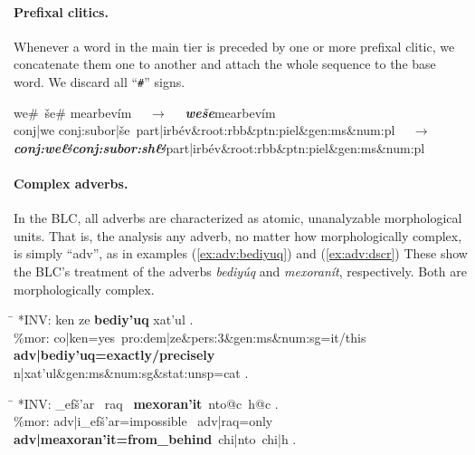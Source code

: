 \paragraph{Prefixal clitics.}
Whenever a word in the main tier is preceded by one or more prefixal clitic, we concatenate them one to another and attach the whole sequence to the base word. We discard all ``\texttt{\#}'' signs.
\begin{exe}\label{ex:preclitics}
	\ex
	\textsf{we\#\, \v{s}e\# mearbev\'im} $\quad\to\quad$ \textbf{\textit{\textsf{we\v{s}e}}}\textsf{mearbev\'im}\\
	\textsf{conj|we conj:subor|\v{s}e\, part|irb\'ev\&root:rbb\&ptn:piel\&gen:ms\&num:pl} $\quad\to\quad$  \\
	\textit{\textbf{\textsf{conj:we\&conj:subor:sh\&}}}\textsf{part|irb\'ev\&root:rbb\&ptn:piel\&gen:ms\&num:pl}
\end{exe}

\paragraph{Complex adverbs.} In the \ac{BLC}, all adverbs are characterized as atomic, unanalyzable morphological units. That is,
the analysis any adverb, no matter how morphologically complex, is simply ``adv'', as in 
examples (\ref{ex:adv:bediyuq}) and (\ref{ex:adv:dscr})  These show the \ac{BLC}'s treatment of the adverbs \textit{\textsf{bediy\'{u}q}} and \textit{\textsf{mexoran\'{i}t}}, respectively. Both are 
morphologically complex.

\begin{exe}
\ex \label{ex:adv:bediyuq}
	\begin{tabbing}
	\hspace{0.6in} \= \hspace{5.5in} \kill
	\textsf{*INV:} \> \textsf{ken ze \textbf{bediy\a'{u}q} xat\a'{u}l .} \\
	\textsf{\%mor:} \> \textsf{co|ken=yes\, pro:dem|ze\&pers:3\&gen:ms\&num:sg=it/this} \\
				\> \textsf{\textbf{adv|bediy\a'{u}q=exactly/precisely}} \\
				\> \textsf{n|xat\a'{u}l\&gen:ms\&num:sg\&stat:unsp=cat .}
	\end{tabbing}
\ex \label{ex:adv:dscr}
	\begin{tabbing}
	\hspace{0.6in} \= \hspace{5.5in} \kill
	\textsf{*INV:} \> \textsf{\_{\textglotstop}{e}f\v{s}\a'{a}r \, raq \, \textbf{mexoran\a'{i}t}\, 
		nto@c\, h@c .} \\
	\textsf{\%mor:} \> \textsf{adv|{\textglotstop}i\_{\textglotstop}ef\v{s}\a'{a}r=impossible \, adv|raq=only}\\
	 \> \textsf{\textbf{adv|me{\textglotstop}axoran\a'{i}t=from\_behind}\, chi|nto\, chi|h .}
	\end{tabbing}
\end{exe}

